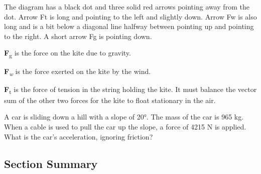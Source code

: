 \documentclass[
]{book}
\begin{document}
The diagram has a black dot and three solid red arrows pointing away
from the dot. Arrow Ft is long and pointing to the left and slightly
down. Arrow Fw is also long and is a bit below a diagonal line halfway
between pointing up and pointing to the right. A short arrow Fg is
pointing down.

\textbf{F}\textsubscript{g} is the force on the kite due to gravity.

\textbf{F}\textsubscript{\emph{w}} is the force exerted on the kite by the wind.

\textbf{F}\textsubscript{t} is the force of tension in the string holding the kite. It must
balance the vector sum of the other two forces for the kite to float
stationary in the air.

\hypertarget{fs-id2154704}{}
\leavevmode{}%
A car is sliding down a hill with a slope of 20°. The mass of the car is
965 kg. When a cable is used to pull the car up the slope, a force of
4215 N is applied. What is the car's acceleration, ignoring friction?

\hypertarget{fs-id2352878-summary}{}
\hypertarget{section-summary-12}{%
\subsection{Section Summary}\label{section-summary-12}}
\end{document}
